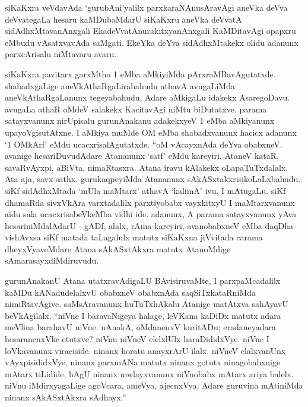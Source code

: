 siKaKxra veVdavAda `gurubAni'yalilx parxkaraNAnusAravAgi aneVka deVva deVvate\-gaLa hesaru kaMDubaMdarU siKaKxru aneVka deVvatA sidAdhxMtavanAnxgali EkadeVvatAnu\-rakitxyanAnxgali KaMDitavAgi opapxru eMbudu vAsatxvavAda saMgati. EkeYka deYva sidAdhxMtakekx olidu adanunx parxcArisalu niMtavaru avaru.

siKaKxra pavitarx garxMtha {\rm 1} eMba aMkiyiMda pArxraMBavAgutatxde. shabadxgaLige aneVkAthaRgaLirabahudu athavA avugaLiMda aneVkAthaRgaLanunx tegeyabahudu, Adare aMkigaLu idakekx AsaregoDavu. avugaLa athaR oMdeV salakekx KacitavAgi niMtu biDutatxve. parama satayxvanunx nirUpisalu gurunAnakanu adakekxyeV {\rm 1} eMba aMkiyanunx upayoVgisutAtxne. I aMkiya muMde OM eMba shabadxvanunx hacicx adanunx `{\rm 1} OMkArf' eMdu ucacxrisalAgutatxde. ``oM vAcayxnAda deYva obabxneV. avanige hesariDuvudAdare Atananunx `satf' eMdu kareyiri. AtaneV kataR, savaRvAyxpi, aBiVta, nimaRtasxra. Atana iravu kAlakekx oLapaTuTxdalalx. Ata aja, savx-sathx. gurukaqpeyiMda Atananunx sAkASxtakxrisikoLaLxbahudu. siKf sidAdhxMtada `mUla maMtarx' athavA `kalimA' ivu, I mAtugaLu. siKf dhamaRda sivxVkAra varxtadalilx parxtiyobabx vayxkitxyU I maMtarxvanunx aidu sala ucacxrisabeVkeMba vidhi ide. adanunx, A parama satayxvanunx yAva hesariniMdalAdarU - gADf, alalx, rAma-kareyiri, avanobabxneV eMba daqDha vishAvxsa siKf matada taLagalulx matutx siKaKxna jiVvitada carama dheyxVyaveMdare Atana sAkASxtAkxra matutx AtanoMdige sAmarasayxdiMdiruvudu.

gurunAnakanU Atana utatxravAdigaLU BAvisiruvaMte, I parxpaMcadalilx kaMDu kANadudelalxvU obabxneV obabxnAda saqSiTxkataRniMda nimiRtavAgive. saMsAravanunx huTuTxhAkalu Atanige matAtxva sahAyavU beVkAgilalx. ``niVne I baravaNigeya halage, leVKana kaDiDx matutx adara meVlina barahavU niVne. nAnakA, oMdanenxV kuritADu; eradaneyadara hesaranenxVke etutxve? niVnu niVneV elelxlUlx haraDididxVye. niVne I loVkavanunx viraciside. ninanx horatu anayxrArU ilalx. niVneV elalxvanUnx vAyxpisididxVye, ninanx parxmANa matutx ninanx gotutx ninagobabxnige mAtarx tiLidide, hAgU ninanx mwlayxvanunx niVnobabx mAtarx ariya balelx. niVnu iMdirxyagaLige agoVcara, ameVya, ajecnxVya, Adare guruvina mAtiniMda ninanx sAkASxtAkxra sAdhayx.''

